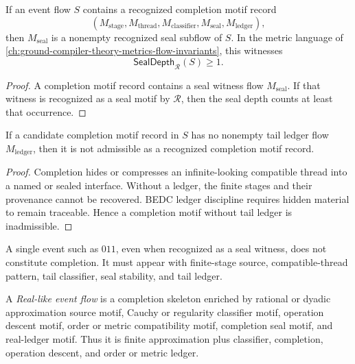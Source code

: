 \begin{proposition}
\label{prop:higher-case-completion-seal-heavy}
If an event flow $S$ contains a recognized completion motif record
$$
  (M_{\mathrm{stage}},M_{\mathrm{thread}},M_{\mathrm{classifier}},M_{\mathrm{seal}},M_{\mathrm{ledger}}),
$$
then $M_{\mathrm{seal}}$ is a nonempty recognized seal subflow of $S$. In the metric language of \autoref{ch:ground-compiler-theory-metrics-flow-invariants}, this witnesses
$$
  \mathsf{SealDepth}_{\mathcal R}(S)\geq 1.
$$
\end{proposition}

\begin{proof}
A completion motif record contains a seal witness flow $M_{\mathrm{seal}}$. If that witness is recognized as a seal motif by $\mathcal R$, then the seal depth counts at least that occurrence.
\end{proof}

\begin{proposition}
\label{prop:higher-case-completion-ledger-dependent}
If a candidate completion motif record in $S$ has no nonempty tail ledger flow $M_{\mathrm{ledger}}$, then it is not admissible as a recognized completion motif record.
\end{proposition}

\begin{proof}
Completion hides or compresses an infinite-looking compatible thread into a named or sealed interface. Without a ledger, the finite stages and their provenance cannot be recovered. BEDC ledger discipline requires hidden material to remain traceable. Hence a completion motif without tail ledger is inadmissible.
\end{proof}

\begin{corollary}
\label{cor:higher-case-seal-alone-not-completion}
A single event such as $011$, even when recognized as a seal witness, does not constitute completion. It must appear with finite-stage source, compatible-thread pattern, tail classifier, seal stability, and tail ledger.
\end{corollary}

\begin{definition}
\label{def:higher-case-real-like-flow}
A \emph{Real-like event flow} is a completion skeleton enriched by rational or dyadic approximation source motif, Cauchy or regularity classifier motif, operation descent motif, order or metric compatibility motif, completion seal motif, and real-ledger motif. Thus it is finite approximation plus classifier, completion, operation descent, and order or metric ledger.
\end{definition}

